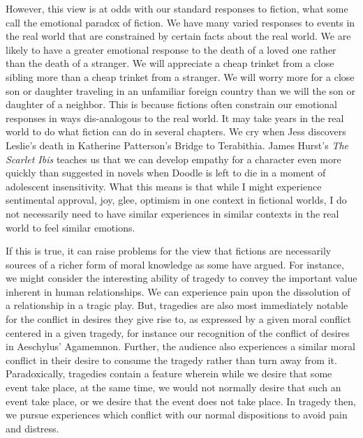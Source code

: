 \documentclass[phdthesis,12pt,final]{wuthesis}
\theoremstyle{definition}
\theoremstyle{definition}
\theoremstyle{definition}
\theoremstyle{definition}
\theoremstyle{remark}
\begin{document}
However, this view is at odds with our standard responses to fiction, what some call the emotional paradox of fiction. We have many varied responses to events in the real world that are constrained by certain facts about the real world. We are likely to have a greater emotional response to the death of a loved one rather than the death of a stranger. We will appreciate a cheap trinket from a close sibling more than a cheap trinket from a stranger. We will worry more for a close son or daughter traveling in an unfamiliar foreign country than we will the son or daughter of a neighbor. This is because fictions often constrain our emotional responses in ways dis-analogous to the real world. It may take years in the real world to do what fiction can do in several chapters. We cry when Jess discovers Leslie's death in Katherine Patterson's Bridge to Terabithia. James Hurst's \emph{The Scarlet Ibis} teaches us that we can develop empathy for a character even more quickly than suggested in novels when Doodle is left to die in a moment of adolescent insensitivity. What this means is that while I might experience sentimental approval, joy, glee, optimism in one context in fictional worlds, I do not necessarily need to have similar experiences in similar contexts in the real world to feel similar emotions.

If this is true, it can raise problems for the view that fictions are necessarily sources of a richer form of moral knowledge as some have argued. For instance, we might consider the interesting ability of tragedy to convey the important value inherent in human relationships. We can experience pain upon the dissolution of a relationship in a tragic play. But, tragedies are also most immediately notable for the conflict in desires they give rise to, as expressed by a given moral conflict centered in a given tragedy, for instance our recognition of the conflict of desires in Aeschylus' Agamemnon. Further, the audience also experiences a similar moral conflict in their desire to consume the tragedy rather than turn away from it. Paradoxically, tragedies contain a feature wherein while we desire that some event take place, at the same time, we would not normally desire that such an event take place, or we desire that the event does not take place. In tragedy then, we pursue experiences which conflict with our normal dispositions to avoid pain and distress.
\end{document}
